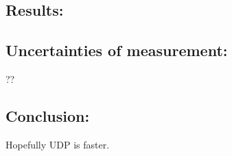 \subsection*{Results:}



\subsection*{Uncertainties of measurement:}

??

\subsection*{Conclusion:}

Hopefully UDP is faster.